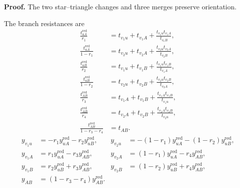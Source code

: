 \documentclass[11pt]{article}
\numberwithin{equation}{section}
\numberwithin{figure}{section}
\numberwithin{table}{section}
\begin{document}
\begin{proofbox}
\textbf{Proof.} The two star--triangle changes and three merges preserve orientation.

The branch resistances are
\begin{equation*}
\begin{aligned}
\frac{t_{uA}^{\mathrm{red}}}{r_1}
&=t_{v_1u}+t_{v_1A}+\frac{t_{v_1u}t_{v_1A}}{t_{v_1B}},\\
\frac{t_{uA}^{\mathrm{red}}}{1-r_1}
&=t_{v_2u}+t_{v_2A}+\frac{t_{v_2u}t_{v_2A}}{t_{v_2B}},\\[2pt]
\frac{t_{uB}^{\mathrm{red}}}{r_2}
&=t_{v_1u}+t_{v_1B}+\frac{t_{v_1u}t_{v_1B}}{t_{v_1A}},\\
\frac{t_{uB}^{\mathrm{red}}}{1-r_2}
&=t_{v_2u}+t_{v_2B}+\frac{t_{v_2u}t_{v_2B}}{t_{v_2A}},\\[2pt]
\frac{t_{AB}^{\mathrm{red}}}{r_3}
&=t_{v_1A}+t_{v_1B}+\frac{t_{v_1A}t_{v_1B}}{t_{v_1u}},\\
\frac{t_{AB}^{\mathrm{red}}}{r_4}
&=t_{v_2A}+t_{v_2B}+\frac{t_{v_2A}t_{v_2B}}{t_{v_2u}},\\
\frac{t_{AB}^{\mathrm{red}}}{1-r_3-r_4}&=t_{AB}.
\end{aligned}
\end{equation*}
\begin{equation}\label{b-01180}
\begin{aligned}
y_{v_1u}&=-r_1y_{uA}^{\mathrm{red}}-r_2y_{uB}^{\mathrm{red}},&
y_{v_2u}&=-(1-r_1)y_{uA}^{\mathrm{red}}-(1-r_2)y_{uB}^{\mathrm{red}},\\
y_{v_1A}&=r_1y_{uA}^{\mathrm{red}}-r_3y_{AB}^{\mathrm{red}},&
y_{v_2A}&=(1-r_1)y_{uA}^{\mathrm{red}}-r_4y_{AB}^{\mathrm{red}},\\
y_{v_1B}&=r_2y_{uB}^{\mathrm{red}}+r_3y_{AB}^{\mathrm{red}},&
y_{v_2B}&=(1-r_2)y_{uB}^{\mathrm{red}}+r_4y_{AB}^{\mathrm{red}},\\
y_{AB}&=(1-r_3-r_4)y_{AB}^{\mathrm{red}}.
\end{aligned}
\end{equation}


\end{proofbox}
\end{document}
